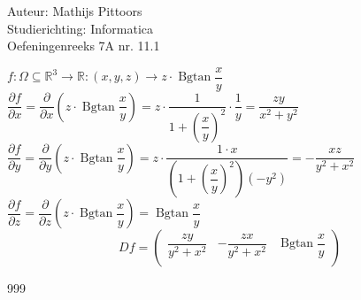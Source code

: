 \documentclass[a4paper]{article}
\newcommand{\Bgtan}{\operatorname{Bgtan}}
\newcommand{\pafg}[2][]{\dfrac{\partial #1}{\partial #2}}
\begin{document}
  
\noindent \large Auteur: Mathijs Pittoors \\
\noindent \large Studierichting: Informatica\\
\noindent \large Oefeningenreeks 7A nr. 11.1\\

\medskip

\normalsize

$ f: \Omega \subseteq \mathbb{R}^3 \rightarrow \mathbb{R}: (x,y,z) \rightarrow z \cdot\Bgtan\dfrac{x}{y}$\\

$ \pafg[f]{x} = \pafg{x} \left(z \cdot \Bgtan \dfrac{x}{y}\right) = z \cdot \dfrac{1}{1+\left(\dfrac{x}{y}\right)^2} \cdot \dfrac{1}{y} = \dfrac{zy}{x^2+y^2}$\\

$ \pafg[f]{y} = \pafg{y} \left(z \cdot \Bgtan \dfrac{x}{y}\right) = z \cdot \dfrac{1 \cdot x}{\left(1+\left(\dfrac{x}{y}\right)^2\right)(-y^2)} = - \dfrac{xz}{y^2 + x^2}$\\

$ \pafg[f]{z} = \pafg{z} \left(z \cdot \Bgtan \dfrac{x}{y}\right) = \Bgtan\dfrac{x}{y}$\\

$$Df = \left (
\begin{array}{ccc}
        \dfrac{zy}{y^2 + x^2} & -\dfrac{zx}{y^2 + x^2} & \operatorname{Bgtan}\dfrac{x}{y}\\
\end{array}
\right )$$

\begin{thebibliography}{999}
\end{thebibliography}
\end{document}
